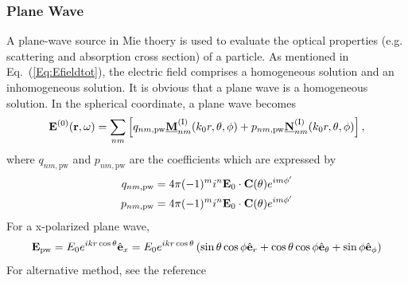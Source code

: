 \documentclass[journal=jacsat,manuscript=article,layout=traditional]{achemso}
\newcommand{\norF}[1]{\underline{\vb{#1}}}
\newcommand{\RomanI}{\scriptsize\textrm{I}}
\begin{document}
\subsubsection{Plane Wave}
A plane-wave source in Mie thoery is used to evaluate the optical properties (e.g. scattering and absorption cross section) of a particle.
As mentioned in Eq.~(\ref{Eq:Efieldtot}), the electric field comprises a homogeneous solution and an inhomogeneous solution.
It is obvious that a plane wave is a homogeneous solution.
In the spherical coordinate, a plane wave becomes
\begin{align}
    \mathbf{E}^{(0)}(\mathbf{r},\omega)=
    \sum_{nm}\left[q_{nm,\mathrm{pw}}\norF{M}_{\mathstrut{nm}}^{(\RomanI)}(k_0r,\theta,\phi)+p_{nm,\mathrm{pw}}\norF{N}_{\mathstrut{nm}}^{(\RomanI)}(k_0r,\theta,\phi)\right],
\end{align}
where $q_{nm,\mathrm{pw}}$ and $p_{nm,\mathrm{pw}}$ are the coefficients which are expressed by
\begin{align}
    q_{nm,\mathrm{pw}}=
    4\pi(-1)^mi^n\vb{E}_0\cdot\vb{C}(\theta)e^{im\phi'}\\
    p_{nm,\mathrm{pw}}=
    4\pi(-1)^mi^n\vb{E}_0\cdot\vb{C}(\theta)e^{im\phi'}
\end{align}
For a x-polarized plane wave,
\begin{align}
    \vb{E}_\mathrm{pw}=E_0e^{ikr\cos\theta}\hat{\vb{e}}_x = 
    E_0e^{ikr\cos\theta}\left(\sin\theta\cos\phi\hat{\vb{e}}_r+\cos\theta\cos\phi\hat{\vb{e}}_\theta+\sin\phi\hat{\vb{e}}_\phi\right)
\end{align}
For alternative method, see the reference\cite{bohren2008absorption}
\end{document}
